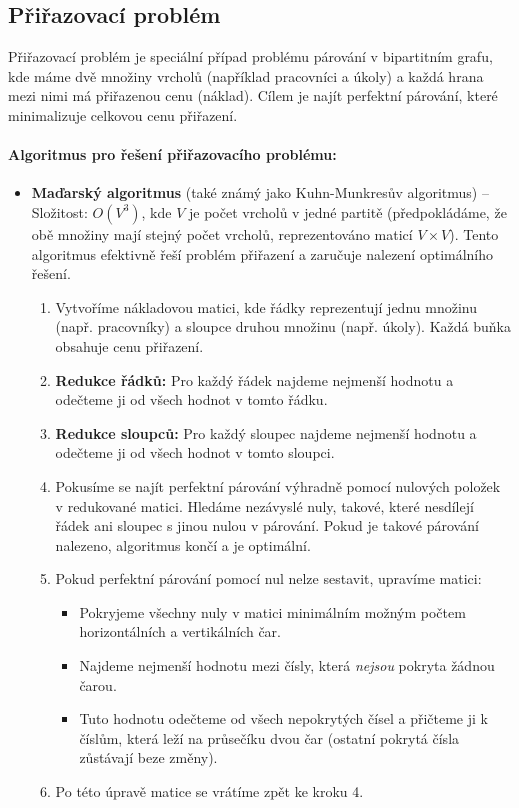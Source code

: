 \subsection{Přiřazovací problém}
Přiřazovací problém je speciální případ problému párování v bipartitním grafu, kde 
máme dvě množiny vrcholů (například pracovníci a úkoly) a každá hrana mezi nimi má 
přiřazenou cenu (náklad). Cílem je najít perfektní párování, které minimalizuje celkovou cenu 
přiřazení.

\paragraph*{Algoritmus pro řešení přiřazovacího problému:}
\begin{itemize}
\item \textbf{Maďarský algoritmus} (také známý jako Kuhn-Munkresův algoritmus) -- Složitost: $O(V^3)$, kde $V$ je počet vrcholů v jedné partitě (předpokládáme, že obě množiny mají stejný počet vrcholů, reprezentováno maticí $V \times V$). Tento algoritmus efektivně řeší problém přiřazení a zaručuje nalezení optimálního řešení.
\begin{enumerate}
    \item Vytvoříme nákladovou matici, kde řádky reprezentují jednu množinu (např. pracovníky) a sloupce druhou množinu (např. úkoly). Každá buňka obsahuje cenu přiřazení.
    \item \textbf{Redukce řádků:} Pro každý řádek najdeme nejmenší hodnotu a odečteme ji od všech hodnot v tomto řádku.
    \item \textbf{Redukce sloupců:} Pro každý sloupec najdeme nejmenší hodnotu a odečteme ji od všech hodnot v tomto sloupci.
    \item Pokusíme se najít perfektní párování výhradně pomocí nulových položek v 
    redukované matici. Hledáme nezávyslé nuly, takové, které nesdílejí řádek ani 
    sloupec s jinou nulou v párování. Pokud je takové párování nalezeno, algoritmus 
    končí a je optimální.
    \item Pokud perfektní párování pomocí nul nelze sestavit, upravíme matici:
    \begin{itemize}
        \item Pokryjeme všechny nuly v matici minimálním možným počtem horizontálních a vertikálních čar.
        \item Najdeme nejmenší hodnotu mezi čísly, která \textit{nejsou} pokryta žádnou čarou.
        \item Tuto hodnotu odečteme od všech nepokrytých čísel a přičteme ji k číslům, která leží na průsečíku dvou čar (ostatní pokrytá čísla zůstávají beze změny).
    \end{itemize}
    \item Po této úpravě matice se vrátíme zpět ke kroku 4.
\end{enumerate}
\end{itemize}

